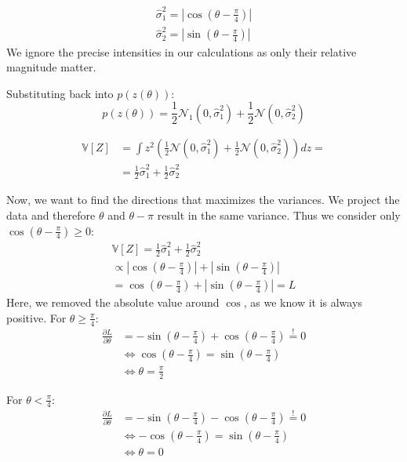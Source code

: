 \begin{align}
    \hat \sigma_1^2 = \left|\cos\left(\theta - \frac{\pi}{4}\right) \right | \\
    \hat \sigma_2^2 = \left|\sin\left(\theta - \frac{\pi}{4}\right) \right |
\end{align}
We ignore the precise intensities in our calculations as only their relative magnitude matter.

Substituting back into $p(z(\theta))$:
\begin{equation}
    p(z(\theta)) = \frac{1}{2} \mathcal{N}_1(0, \hat \sigma_1^2) + \frac{1}{2} \mathcal{N}(0, \hat \sigma_2^2)
\end{equation}

\begin{align}
    \mathbb{V}[Z] &= \int z^2 \left( \frac{1}{2} \mathcal{N}(0, \hat \sigma_1^2) + \frac{1}{2} \mathcal{N}(0, \hat \sigma_2^2) \right) dz = \\
         &= \frac{1}{2} \hat \sigma_1^2 + \frac{1}{2} \hat \sigma_2^2
\end{align}

Now, we want to find the directions that maximizes the variances.
We project the data and therefore $\theta$ and  $\theta - \pi$ result in
the same variance.
Thus we consider only $\cos \left( \theta - \frac{\pi}{4} \right) \ge 0$:
\begin{align}
    \mathbb{V}[Z]= \frac{1}{2} \hat \sigma_1^2 + \frac{1}{2}\hat \sigma_2^2 \\
      \propto \left| \cos \left(\theta - \frac{\pi}{4} \right)\right| + \left| \sin \left(\theta - \frac{\pi}{4} \right) \right| \\
      = \cos \left(\theta - \frac{\pi}{4} \right) + \left| \sin \left(\theta - \frac{\pi}{4} \right) \right| = L
\end{align}
Here, we removed the absolute value around $\cos$, as we know it is always positive.
\def\pif{\frac{\pi}{4}}
For $\theta \ge \pif$:
\begin{align}
    \frac{\partial L}{\partial \theta} & = - \sin\left(\theta - \frac{\pi}{4}\right) + \cos\left(\theta - \frac{\pi}{4}\right) \stackrel{!}{=} 0 \\
                & \iff \cos\left(\theta - \frac{\pi}{4}\right) = \sin\left(\theta - \frac{\pi}{4}\right) \\
                & \iff \theta = \frac{\pi}{2}
\end{align}

For $\theta < \pif$:
\begin{align}
    \frac{\partial L}{\partial \theta} & = - \sin\left(\theta - \frac{\pi}{4}\right) - \cos\left(\theta - \frac{\pi}{4}\right) \stackrel{!}{=} 0 \\
                & \iff - \cos\left(\theta - \frac{\pi}{4}\right) = \sin\left(\theta - \frac{\pi}{4}\right) \\
                & \iff \theta = 0
\end{align}

